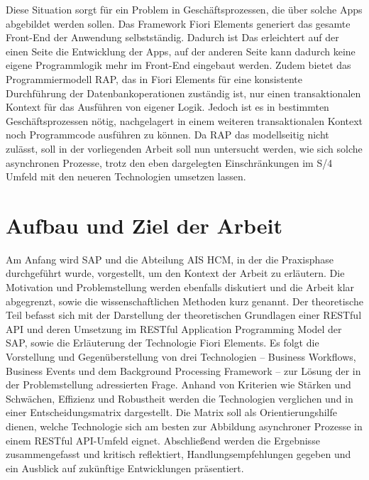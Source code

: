 Diese Situation sorgt für ein Problem in Geschäftsprozessen, die über solche Apps abgebildet werden sollen. Das Framework Fiori Elements generiert das gesamte Front-End der Anwendung selbstständig. Dadurch ist Das erleichtert auf der einen Seite die Entwicklung der Apps, auf der anderen Seite kann dadurch keine eigene Programmlogik mehr im Front-End eingebaut werden. Zudem bietet das Programmiermodell RAP, das in Fiori Elements für eine konsistente Durchführung der Datenbankoperationen zuständig ist, nur einen transaktionalen Kontext für das Ausführen von eigener Logik. Jedoch ist es in bestimmten Geschäftsprozessen nötig, nachgelagert in einem weiteren transaktionalen Kontext noch Programmcode ausführen zu können. Da RAP das modellseitig nicht zulässt, soll in der vorliegenden Arbeit soll nun untersucht werden, wie sich solche asynchronen Prozesse, trotz den eben dargelegten Einschränkungen im S/4 Umfeld mit den neueren Technologien umsetzen lassen.


\section{Aufbau und Ziel der Arbeit}

Am Anfang wird SAP und die Abteilung AIS HCM, in der die Praxisphase durchgeführt wurde, vorgestellt, um den Kontext der Arbeit zu erläutern. Die Motivation und Problemstellung werden ebenfalls diskutiert und die Arbeit klar abgegrenzt, sowie die wissenschaftlichen Methoden kurz genannt. Der theoretische Teil befasst sich mit der Darstellung der theoretischen Grundlagen einer RESTful API und deren Umsetzung im RESTful Application Programming Model der SAP, sowie die Erläuterung der Technologie Fiori Elements. Es folgt die Vorstellung und Gegenüberstellung von drei Technologien – Business Workflows, Business Events und dem Background Processing Framework – zur Lösung der in der Problemstellung adressierten Frage. Anhand von Kriterien wie Stärken und Schwächen, Effizienz und Robustheit werden die Technologien verglichen und in einer Entscheidungsmatrix dargestellt. Die Matrix soll als Orientierungshilfe dienen, welche Technologie sich am besten zur Abbildung asynchroner Prozesse in einem RESTful API-Umfeld eignet. Abschließend werden die Ergebnisse zusammengefasst und kritisch reflektiert, Handlungsempfehlungen gegeben und ein Ausblick auf zukünftige Entwicklungen präsentiert.

